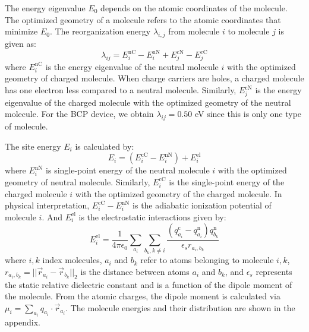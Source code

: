 \documentclass[letterpaper,12pt]{article}
\begin{document}
The energy eigenvalue $E_0$ depends on the atomic coordinates of the molecule. The optimized geometry of a molecule refers to the atomic coordinates that minimize $E_0$.
The reorganization energy $\lambda_{i,j}$ from molecule $i$ to molecule $j$ is given as:
\begin{equation}
    \lambda_{ij} = E_i^\text{nC} - E_i^\text{nN} + E_j^\text{cN} - E_j^\text{cC}
\end{equation}
where $E_i^\text{nC}$ is the energy eigenvalue of the neutral molecule $i$ with the optimized geometry of charged molecule. When charge carriers are holes, a charged molecule has one electron less compared to a neutral molecule. Similarly, $E_j^\text{cN}$ is the energy eigenvalue of the charged molecule with the optimized geometry of the neutral molecule. For the BCP device, we obtain $\lambda_{ij}=0.50$ eV since this is only one type of molecule.

The site energy $E_i$ is calculated by:
\begin{equation}
    E_i = (E_i^\text{cC} - E_i^\text{nN}) + E_i^\text{el}
    \label{eq:siteE}
\end{equation}
where $E_i^\text{nN}$ is single-point energy of the neutral molecule $i$ with the optimized geometry of neutral molecule. Similarly, $E_i^\text{cC}$ is the single-point energy of the charged molecule $i$ with the optimized geometry of the charged molecule. In physical interpretation, $E_i^\text{cC} - E_i^\text{nN}$ is the adiabatic ionization potential of molecule $i$.
And $E_i^\text{el}$ is the electrostatic interactions given by:
%
\begin{equation}
    E_i^\text{el} = \frac{1}{4 \pi \epsilon_0} \sum\limits_{a_i} \sum\limits_{b_k,k\neq i} 
    \frac{(q_{a_i}^\text{c} - q_{a_i}^\text{n}) q_{b_k}^\text{n}}{\epsilon_s r_{a_i,b_k}}
    \label{equ:Eel}
\end{equation}
%
where $i,k$ index molecules, $a_i$ and $b_k$ refer to atoms belonging to molecule $i,k$, $r_{a_i,b_k} = || \vec{r}_{a_i} - \vec{r}_{b_k} ||_2$ is the distance between atoms $a_i$ and $b_k$, and $\epsilon_s$ represents the static relative dielectric constant and is a function of the dipole moment of the molecule. From the atomic charges, the dipole moment is calculated via $\mu_i = \sum\limits_{a_i} q_{a_i} \cdot \vec{r}_{a_i}$. The molecule energies and their distribution are shown in the appendix.
\end{document}
